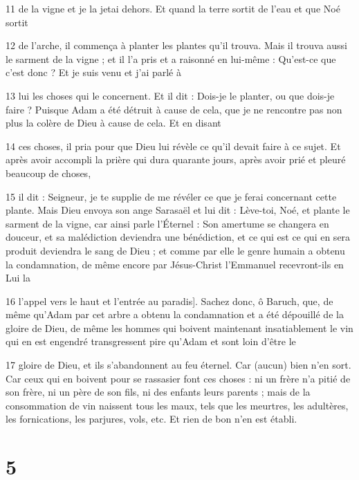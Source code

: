\par 11 de la vigne et je la jetai dehors. Et quand la terre sortit de l'eau et que Noé sortit

\par 12 de l'arche, il commença à planter les plantes qu'il trouva. Mais il trouva aussi le sarment de la vigne ; et il l'a pris et a raisonné en lui-même : Qu'est-ce que c'est donc ? Et je suis venu et j'ai parlé à

\par 13 lui les choses qui le concernent. Et il dit : Dois-je le planter, ou que dois-je faire ? Puisque Adam a été détruit à cause de cela, que je ne rencontre pas non plus la colère de Dieu à cause de cela. Et en disant

\par 14 ces choses, il pria pour que Dieu lui révèle ce qu'il devait faire à ce sujet. Et après avoir accompli la prière qui dura quarante jours, après avoir prié et pleuré beaucoup de choses,

\par 15 il dit : Seigneur, je te supplie de me révéler ce que je ferai concernant cette plante. Mais Dieu envoya son ange Sarasaël et lui dit : Lève-toi, Noé, et plante le sarment de la vigne, car ainsi parle l'Éternel : Son amertume se changera en douceur, et sa malédiction deviendra une bénédiction, et ce qui est ce qui en sera produit deviendra le sang de Dieu ; et comme par elle le genre humain a obtenu la condamnation, de même encore par Jésus-Christ l'Emmanuel recevront-ils en Lui la

\par 16 l'appel vers le haut et l'entrée au paradis]. Sachez donc, ô Baruch, que, de même qu'Adam par cet arbre a obtenu la condamnation et a été dépouillé de la gloire de Dieu, de même les hommes qui boivent maintenant insatiablement le vin qui en est engendré transgressent pire qu'Adam et sont loin d'être le

\par 17 gloire de Dieu, et ils s'abandonnent au feu éternel. Car (aucun) bien n’en sort. Car ceux qui en boivent pour se rassasier font ces choses : ni un frère n'a pitié de son frère, ni un père de son fils, ni des enfants leurs parents ; mais de la consommation de vin naissent tous les maux, tels que les meurtres, les adultères, les fornications, les parjures, vols, etc. Et rien de bon n’en est établi.

\chapter{5}

